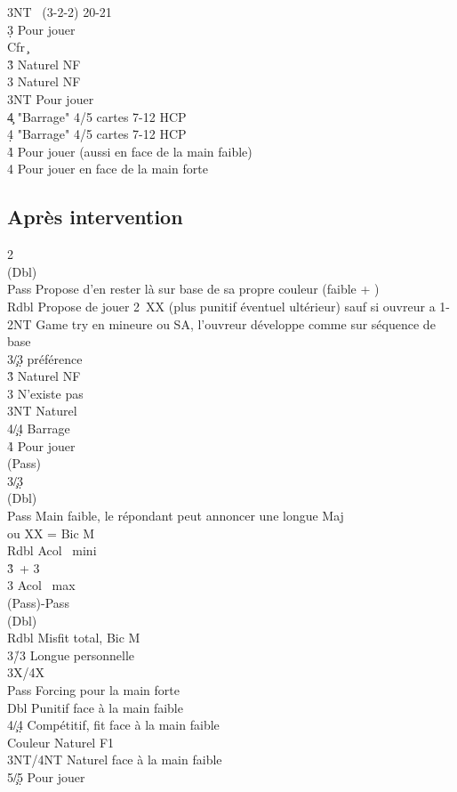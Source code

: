 \documentclass[a4paper]{article}
\begin{document}
\begin{bidtable}
3NT \s\ (3-2-2) 20-21\-\\
3\d \> Pour jouer\+\\
Cfr \c \-\\
3\h \> Naturel NF\\
3\s \> Naturel NF\\
3NT \> Pour jouer\\
4\c \> "Barrage" 4/5 cartes 7-12 HCP\\
4\d \> "Barrage" 4/5 cartes 7-12 HCP\\
4\h \> Pour jouer (aussi en face de la main faible)\\
4\s \> Pour jouer en face de la main forte\-
\end{bidtable}

\subsection{Après intervention}

\begin{bidtable}
2\s\+\\
(Dbl)\+\\
Pass \> Propose d'en rester là sur base de sa propre couleur (faible + \s )\\
Rdbl \> Propose de jouer 2\s\ XX (plus punitif éventuel ultérieur) sauf si ouvreur a 1- \s \\
2NT \> Game try en mineure ou SA, l'ouvreur développe comme sur séquence de base\\
3\c/3\d \> préférence\\
3\h \> Naturel NF\\
3\s \> N'existe pas\\
3NT \> Naturel\\
4\c/4\d \> Barrage\\
4\h \> Pour jouer\-\\
(Pass)\+\\
3\c/3\d\+\\
(Dbl)\+\\
Pass \> Main faible, le répondant peut annoncer une longue Maj\\
\>ou XX = Bic M \\
Rdbl \> Acol \s\ mini\\
3\h {}\s\ + 3\h \\
3\s \> Acol \s\ max\-\\
(Pass)-Pass\+\\
(Dbl)\+\\
Rdbl \> Misfit total, Bic M\\
3\h/3\s \> Longue personnelle\-\-\-\-\\
3X/4X\+\\
Pass \> Forcing pour la main forte\\
Dbl \> Punitif face à la main faible\\
4\c/4\d \> Compétitif, fit face à la main faible\\
Couleur \> Naturel F1\\
3NT/4NT \> Naturel face à la main faible\\
5\c/5\d \> Pour jouer\-\-
\end{bidtable}
\end{document}
